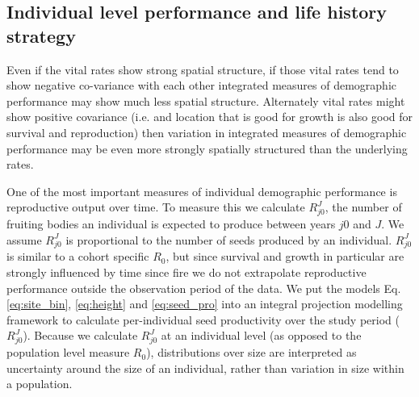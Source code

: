 \documentclass[12pt,a4paper]{article}
\begin{document}
\subsection*{Individual level performance and life history strategy}
Even if the vital rates show strong spatial structure, if those vital rates tend to show negative co-variance with each other integrated measures of demographic performance may show much less spatial structure. Alternately vital rates might show positive covariance (i.e. and location that is good for growth is also good for survival and reproduction) then variation in integrated measures of demographic performance may be even more strongly spatially structured than the underlying rates. 

One of the most important measures of individual demographic performance is reproductive output over time. To measure this we calculate $R_{j0}^J$, the number of fruiting bodies an individual is expected to produce between years $j0$ and $J$. We assume $R_{j0}^J$ is proportional to the number of seeds produced by an individual. $R_{j0}^J$ is similar to a cohort specific $R_0$, but since survival and growth in particular are strongly influenced by time since fire we do not extrapolate reproductive performance outside the observation period of the data. We put the models Eq. \ref{eq:site_bin}, \ref{eq:height} and \ref{eq:seed_pro} into an integral projection modelling framework to calculate per-individual seed productivity over the study period ($R_{j0}^J$). Because we calculate $R_{j0}^J$ at an individual level (as opposed to the population level measure $R_0$), distributions over size are interpreted as uncertainty around the size of an individual, rather than variation in size within a population.    
\end{document}
